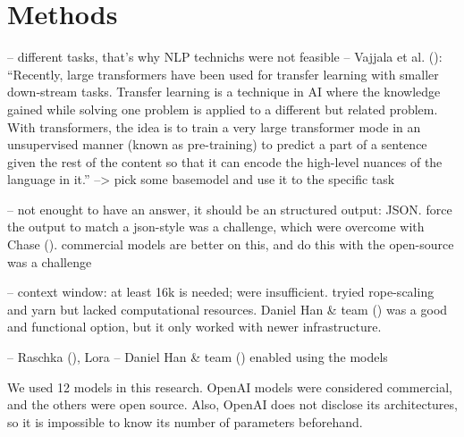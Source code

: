 \documentclass[
  12pt,
  letterpaper,
]{book}
\begin{document}
\section{Methods}\label{methods}

-- different tasks, that's why NLP technichs were not feasible --
Vajjala et al. ():
``Recently, large transformers have been used for transfer learning with
smaller down‐stream tasks. Transfer learning is a technique in AI where
the knowledge gained while solving one problem is applied to a different
but related problem. With transformers, the idea is to train a very
large transformer mode in an unsupervised manner (known as pre-training)
to predict a part of a sentence given the rest of the content so that it
can encode the high-level nuances of the language in it.''
--\textgreater{} pick some basemodel and use it to the specific task

-- not enought to have an answer, it should be an structured output:
JSON. force the output to match a json-style was a challenge, which were
overcome with Chase ().
commercial models are better on this, and do this with the open-source
was a challenge

-- context window: at least 16k is needed; were insufficient. tryied
rope-scaling and yarn but lacked computational resources. Daniel Han \&
team () was a good and
functional option, but it only worked with newer infrastructure.

-- Raschka (), Lora -- Daniel Han
\& team () enabled using the
models

We used 12 models in this research. OpenAI models were considered
commercial, and the others were open source. Also, OpenAI does not
disclose its architectures, so it is impossible to know its number of
parameters beforehand.
\end{document}
